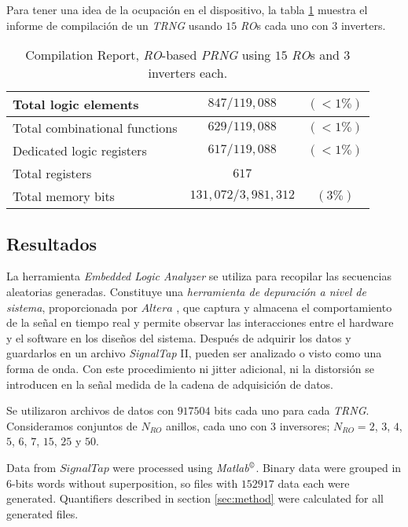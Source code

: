 Para tener una idea de la ocupación en el dispositivo, la tabla \ref{table:compilation} muestra el informe de compilación de un \emph{TRNG} usando $15$ \emph{RO}s cada uno con $3$ inverters.
\begin{table}
\begin{center}
\begin{tabular}{| l | c  c | }
	\hline
	\footnotesize{Total logic elements}          & $847/119,088$       & $( < 1 \%)$  \\ \hline
	\footnotesize{Total combinational functions} & $629/119,088$       & $( < 1 \%)$  \\ \hline
	\footnotesize{Dedicated logic registers}     & $617/119,088$       & $( < 1 \%)$  \\ \hline
	\footnotesize{Total registers}               & $617$               &  \\ \hline
	\footnotesize{Total memory bits}             & $131,072/3,981,312$ & $( 3 \%)$    \\ \hline
\end{tabular}
\end{center}
\caption{Compilation Report, \emph{RO}-based \emph{PRNG} using $15$ \emph{RO}s and $3$ inverters each.}
\label{table:compilation}
\end{table}

\subsection{Resultados}
\label{sec:results}

La herramienta \emph{Embedded Logic Analyzer} se utiliza para recopilar las secuencias aleatorias generadas.
Constituye una \emph{herramienta de depuración a nivel de sistema}, proporcionada por $ Altera $ \cite{CUARTO}, que captura y almacena el comportamiento de la señal en tiempo real y permite observar las interacciones entre el hardware y el software en los diseños del sistema.
Después de adquirir los datos y guardarlos en un archivo \emph{SignalTap} II, pueden ser analizado o visto como una forma de onda.
Con este procedimiento ni jitter adicional, ni la distorsión se introducen en la señal medida de la cadena de adquisición de datos.

Se utilizaron archivos de datos con $917504$ bits cada uno para cada \emph{TRNG}.
Consideramos conjuntos de $N_ {RO}$ anillos, cada uno con $3$ inversores; $N_{RO}=2$, $3$, $4$, $5$, $6$, $7$, $15$, $25$ y $50$.

Data from $SignalTap$ were  processed using \emph{Matlab}$^\copyright$. Binary data were grouped in $6$-bits words without
superposition, so files with $152917$ data each were generated. Quantifiers described in section \ref{sec:method} were calculated
for all generated files.

